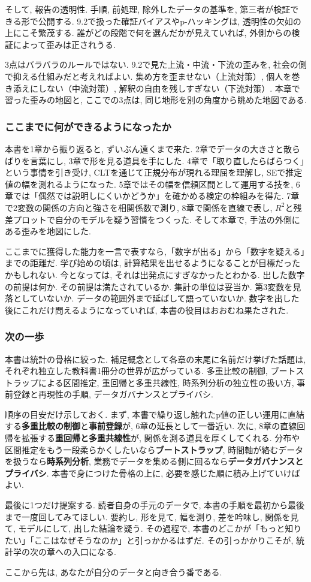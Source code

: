 そして, 報告の透明性. 手順, 前処理, 除外したデータの基準を, 第三者が検証できる形で公開する.
9.2で扱った確証バイアスやp-ハッキングは, 透明性の欠如の上にこそ繁茂する.
誰がどの段階で何を選んだかが見えていれば, 外側からの検証によって歪みは正されうる.

3点はバラバラのルールではない.
9.2で見た上流・中流・下流の歪みを, 社会の側で抑える仕組みだと考えればよい.
集め方を歪ませない（上流対策）, 個人を巻き添えにしない（中流対策）, 解釈の自由を残しすぎない（下流対策）.
本章で習った歪みの地図と, ここでの3点は, 同じ地形を別の角度から眺めた地図である.

\subsubsection*{ここまでに何ができるようになったか}

本書を1章から振り返ると, ずいぶん遠くまで来た.
2章でデータの大きさと散らばりを言葉にし, 3章で形を見る道具を手にした.
4章で「取り直したらばらつく」という事情を引き受け, CLTを通じて正規分布が現れる理屈を理解し, SEで推定値の幅を測れるようになった.
5章ではその幅を信頼区間として運用する技を, 6章では「偶然では説明しにくいかどうか」を確かめる検定の枠組みを得た.
7章で2変数の関係の方向と強さを相関係数で測り, 8章で関係を直線で表し, $R^2$と残差プロットで自分のモデルを疑う習慣をつくった.
そして本章で, 手法の外側にある歪みを地図にした.

ここまでに獲得した能力を一言で表すなら,「数字が出る」から「数字を疑える」までの距離だ.
学び始めの頃は, 計算結果を出せるようになることが目標だったかもしれない.
今となっては, それは出発点にすぎなかったとわかる.
出した数字の前提は何か. その前提は満たされているか. 集計の単位は妥当か. 第3変数を見落としていないか. データの範囲外まで延ばして語っていないか.
数字を出した後にこれだけ問えるようになっていれば, 本書の役目はおおむね果たされた.

\subsubsection*{次の一歩}

本書は統計の骨格に絞った. 補足概念として各章の末尾に名前だけ挙げた話題は, それぞれ独立した教科書1冊分の世界が広がっている.
多重比較の制御, ブートストラップによる区間推定, 重回帰と多重共線性, 時系列分析の独立性の扱い方, 事前登録と再現性の手順, データガバナンスとプライバシ.

順序の目安だけ示しておく.
まず, 本書で繰り返し触れたp値の正しい運用に直結する\textbf{多重比較の制御}と\textbf{事前登録}が, 6章の延長として一番近い.
次に, 8章の直線回帰を拡張する\textbf{重回帰と多重共線性}が, 関係を測る道具を厚くしてくれる.
分布や区間推定をもう一段柔らかくしたいなら\textbf{ブートストラップ}, 時間軸が絡むデータを扱うなら\textbf{時系列分析}, 業務でデータを集める側に回るなら\textbf{データガバナンスとプライバシ}.
本書で身につけた骨格の上に, 必要を感じた順に積み上げていけばよい.

最後に1つだけ提案する.
読者自身の手元のデータで, 本書の手順を最初から最後まで一度回してみてほしい.
要約し, 形を見て, 幅を測り, 差を吟味し, 関係を見て, モデルにして, 出した結論を疑う.
その過程で, 本書のどこかが「もっと知りたい」「ここはなぜそうなのか」と引っかかるはずだ.
その引っかかりこそが, 統計学の次の章への入口になる.

ここから先は, あなたが自分のデータと向き合う番である.
